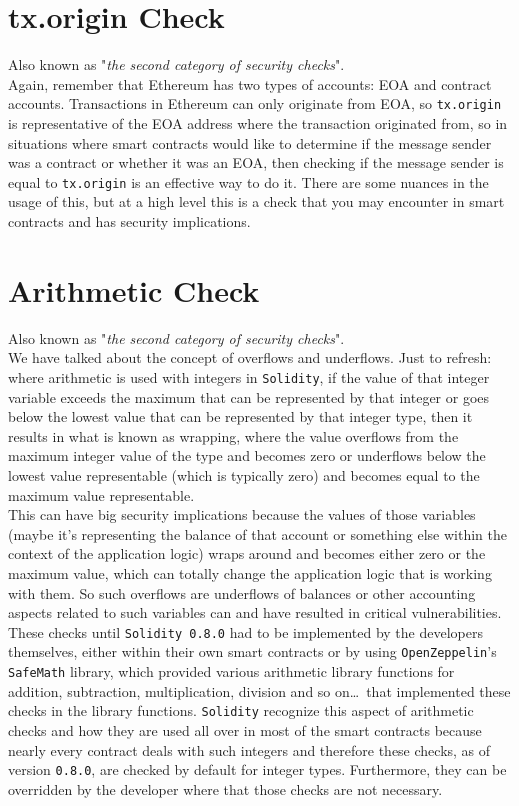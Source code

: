 \section{tx.origin Check}
Also known as "\textit{the second category of security checks}".\\

Again, remember that Ethereum has two types of accounts: EOA and contract accounts. Transactions in Ethereum can only originate from EOA, so \verb|tx.origin| is representative of the EOA address where the transaction originated from, so in situations where smart contracts would like to determine if the message sender was a contract or  whether it was an EOA, then checking if the message sender is equal to \verb|tx.origin| is an effective way to do it. There are some nuances in the usage of this, but at a high level this is a check that you may encounter in smart contracts and has security implications.

\section{Arithmetic Check}
Also known as "\textit{the second category of security checks}".\\

We have talked about the concept of overflows and underflows. Just to refresh: where arithmetic is used with integers in \verb|Solidity|, if the value of that integer variable exceeds the maximum that can be represented by that integer or goes below the lowest value that can be represented by that integer type, then it results in what is known as wrapping, where the value overflows from the maximum integer value of the type and becomes zero or underflows below the lowest value representable (which is typically zero) and becomes equal to the maximum value representable.\\

This can have big security implications because the values of those variables (maybe it's representing the balance of that account or something else within the context of the application logic) wraps around and becomes either zero or the maximum value, which can totally change the application logic that is working with them. So such overflows are underflows of balances or other accounting aspects related to such variables can and have resulted in critical vulnerabilities.\\

These checks until \verb|Solidity 0.8.0| had to be implemented by the developers themselves, either within their own smart contracts or by using \verb|OpenZeppelin|'s \verb|SafeMath| library, which provided various arithmetic library functions for addition, subtraction, multiplication, division and so on\dots\, that implemented these checks in the library functions. \verb|Solidity| recognize this aspect of arithmetic checks and how they are used all over in most of the smart contracts because nearly every contract deals with such integers and therefore these checks, as of version \verb|0.8.0|, are checked by default for integer types. Furthermore, they can be overridden by the developer where that those checks are not necessary.\\

